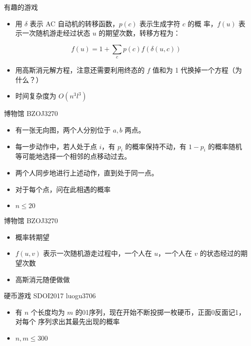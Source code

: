 \documentclass{beamer}
\begin{document}
    \begin{frame}{有趣的游戏}
        \begin{itemize}
            \setlength{\itemsep}{10pt}
            \item 用 $\delta$ 表示 AC 自动机的转移函数，$p(c)$ 表示生成字符 $c$ 的概
            率，$f(u)$ 表示一次随机游走经过状态 $u$ 的期望次数，转移方程为：
        \end{itemize}
        $$
            f(u) = 1+\sum_{c} p(c)f\left(\delta(u,c)\right)
        $$
        \begin{itemize}
            \setlength{\itemsep}{10pt}
            \item 用高斯消元解方程，注意还需要利用终态的 $f$ 值和为 1 代换掉一个方程（为什么？）
            \item 时间复杂度为 $O(n^3l^3)$
        \end{itemize}
    \end{frame}

    \begin{frame}{博物馆}
        {BZOJ3270}
        \begin{itemize}
            \setlength{\itemsep}{10pt}
            \item 有一张无向图，两个人分别位于 $a,b$ 两点。
            \item 每一步动作中，若人处于点 $i$，有 $p_i$ 的概率保持不动，有 $1-p_i$ 的概率随机等可能地选择一个相邻的点移动过去。
            \item 两个人同步地进行上述动作，直到处于同一点。
            \item 对于每个点，问在此相遇的概率
            \item $n\le 20$
        \end{itemize}
    \end{frame}

    \begin{frame}{博物馆}
        {BZOJ3270}
        \begin{itemize}
            \setlength{\itemsep}{10pt}
            \item 概率转期望
            \item $f(u,v)$ 表示一次随机游走过程中，一个人在 $u$，一个人在 $v$ 的状态经过的期望次数
            \item 高斯消元随便做做
        \end{itemize}
    \end{frame}

    \begin{frame}{硬币游戏}
        {SDOI2017 luogu3706}
        \begin{itemize}
            \setlength{\itemsep}{10pt}
            \item 有 $n$ 个长度均为 $m$ 的01序列，现在开始不断投掷一枚硬币，正面0反面记1，对每个
            序列求出其最先出现的概率
            \item $n,m\le 300$
        \end{itemize}
    \end{frame}
\end{document}
